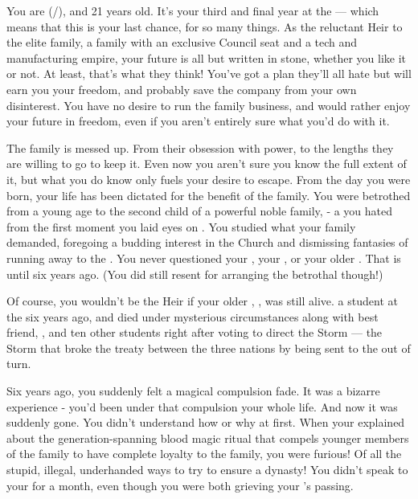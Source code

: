 \documentclass[char]{GL2020}
\begin{document}
\name{\cHeir{}}

You are \cHeir{\full} (\cHeir{\they}/\cHeir{\them}), and 21 years old. It's your third and final year at the \pSchool{} — which means that this is your last chance, for so many things. As the reluctant Heir to the elite \cHeir{\formal} family, a family with an exclusive Council seat and a tech and manufacturing empire, your future is all but written in stone, whether you like it or not. At least, that's what they think! You've got a plan they'll all hate but will earn you your freedom, and probably save the company from your own disinterest. You have no desire to run the family business, and would rather enjoy your future in freedom, even if you aren't entirely sure what you'd do with it.

The \cHeir{\formal} family is messed up. From their obsession with power, to the lengths they are willing to go to keep it. Even now you aren’t sure you know the full extent of it, but what you do know only fuels your desire to escape. From the day you were born, your life has been dictated for the benefit of the family. You were betrothed from a young age to the second child of a powerful \pFarm{} noble family, \cChupStudent{\full} - a \cChupStudent{\kid} you hated from the first moment you laid eyes on \cChupStudent{\them}. You studied what your family demanded, foregoing a budding interest in the Church and dismissing fantasies of running away to the \pShip{}. You never questioned your \cFaledonParent{\parent} \cFaledonParent{}, your \cDiplomat{\auncle} \cDiplomat{\auncle}, or your older \cHeirSibling{\sibling} \cHeirSibling{}. That is until six years ago. (You did still resent \cDiplomat{} for arranging the betrothal though!)

Of course, you wouldn't be the \cHeir{\formal} Heir if your older \cHeirSibling{\sibling}, \cHeirSibling{\full}, was still alive. \cHeirSibling{\Theywere} a student at the \pSchool{} six years ago, and died under mysterious circumstances along with \cHeirSibling{\their} best friend, \cKidScientist{\full}, and ten other students right after voting to direct the Storm — the Storm that broke the treaty between the three nations by being sent to the \pShip{} out of turn. 

Six years ago, you suddenly felt a magical compulsion fade. It was a bizarre experience - you’d been under that compulsion your whole life. And now it was suddenly gone. You didn’t understand how or why at first. When your \cFaledonParent{\parent} explained about the generation-spanning blood magic ritual that compels younger members of the \cHeir{\formal} family to have complete loyalty to the family, you were furious! Of all the stupid, illegal, underhanded ways to try to ensure a dynasty! You didn’t speak to your \cFaledonParent{\parent} for a month, even though you were both grieving your \cHeirSibling{\sibling}’s passing.
\end{document}
